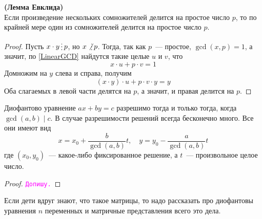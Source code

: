 \documentclass[11pt]{article}
\begin{document}
	\begin{lemma} \textbf{(Лемма Евклида)}\\
		Если произведение нескольких сомножителей делится на простое число $p$, то по крайней мере один из сомножителей делится
		на простое число $p$.
	\end{lemma}
	\begin{proof}
	    Пусть $x \cdot y \divisible p$, но $x \not\divisible p$. Тогда, так как $p$~--- простое, $\gcd(x, p) = 1$, а значит, по
		\ref{LinearGCD} найдутся такие целые $u$ и $v$, что
		\[ x \cdot u + p \cdot v = 1 \]
		Домножим на $y$ слева и справа, получим
		\[ (x \cdot y) \cdot u + p \cdot v \cdot y = y \]
		Оба слагаемых в левой части делятся на $p$, а значит, и правая делится на $p$.
	\end{proof}
	\begin{theorem}
		Диофантово уравнение $ax + by = c$ разрешимо тогда и только тогда, когда $\gcd(a, b) \mid c$. В случае разрешимости
		решений всегда бесконечно много. Все они имеют вид
		\[ x = x_0 + \frac{b}{\gcd(a, b)}t, \quad y = y_0 - \frac{a}{\gcd(a, b)}t \]
		где $(x_0, y_0)$~--- какое-либо фиксированное решение, а $t$~--- произвольное целое число.
	\end{theorem}
	\begin{proof}
	    \textcolor{magenta}{\texttt{Допишу.}}
	\end{proof}
	\begin{remark}
	    Если дети вдруг знают, что такое матрицы, то надо рассказать про диофантовы уравнения $n$ переменных и матричные представления всего это дела.
	\end{remark}
\end{document}
